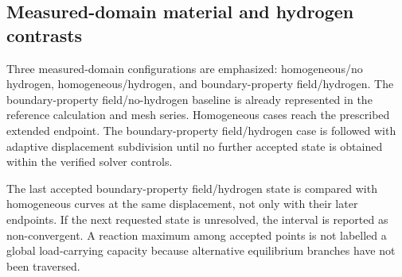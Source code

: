 \documentclass[preprint,12pt]{elsarticle}
\begin{document}
\subsection{Measured-domain material and hydrogen contrasts}

Three measured-domain configurations are emphasized: homogeneous/no hydrogen, homogeneous/hydrogen, and boundary-property field/hydrogen. The boundary-property field/no-hydrogen baseline is already represented in the reference calculation and mesh series. Homogeneous cases reach the prescribed extended endpoint. The boundary-property field/hydrogen case is followed with adaptive displacement subdivision until no further accepted state is obtained within the verified solver controls.

The last accepted boundary-property field/hydrogen state is compared with homogeneous curves at the same displacement, not only with their later endpoints. If the next requested state is unresolved, the interval is reported as non-convergent. A reaction maximum among accepted points is not labelled a global load-carrying capacity because alternative equilibrium branches have not been traversed.
\end{document}
